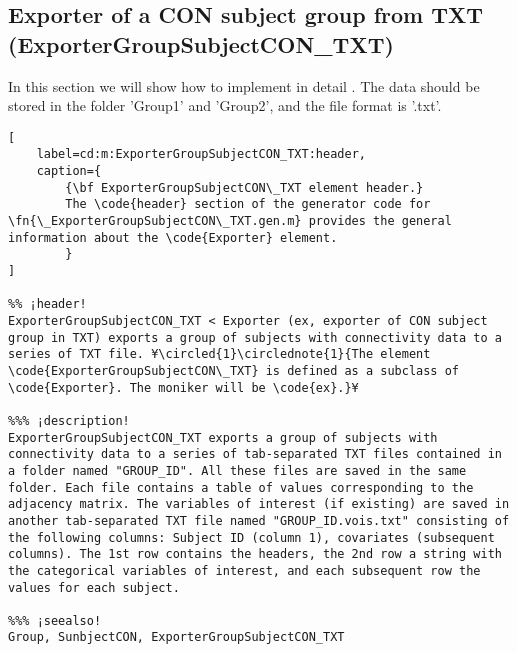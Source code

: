 \documentclass{tufte-handout}
\begin{document}
\subsection{Exporter of a CON subject group from TXT (ExporterGroupSubjectCON\_TXT)}

In this section we will show how to implement in detail . The data should be stored in the folder 'Group1' and 'Group2', and the file format is '.txt'.

\begin{lstlisting}[
	label=cd:m:ExporterGroupSubjectCON_TXT:header,
	caption={
		{\bf ExporterGroupSubjectCON\_TXT element header.}
		The \code{header} section of the generator code for \fn{\_ExporterGroupSubjectCON\_TXT.gen.m} provides the general information about the \code{Exporter} element.
		}
]

%% ¡header!
ExporterGroupSubjectCON_TXT < Exporter (ex, exporter of CON subject group in TXT) exports a group of subjects with connectivity data to a series of TXT file. ¥\circled{1}\circlednote{1}{The element \code{ExporterGroupSubjectCON\_TXT} is defined as a subclass of \code{Exporter}. The moniker will be \code{ex}.}¥

%%% ¡description!
ExporterGroupSubjectCON_TXT exports a group of subjects with connectivity data to a series of tab-separated TXT files contained in a folder named "GROUP_ID". All these files are saved in the same folder. Each file contains a table of values corresponding to the adjacency matrix. The variables of interest (if existing) are saved in another tab-separated TXT file named "GROUP_ID.vois.txt" consisting of the following columns: Subject ID (column 1), covariates (subsequent columns). The 1st row contains the headers, the 2nd row a string with the categorical variables of interest, and each subsequent row the values for each subject.

%%% ¡seealso!
Group, SunbjectCON, ExporterGroupSubjectCON_TXT
\end{lstlisting}
\end{document}
